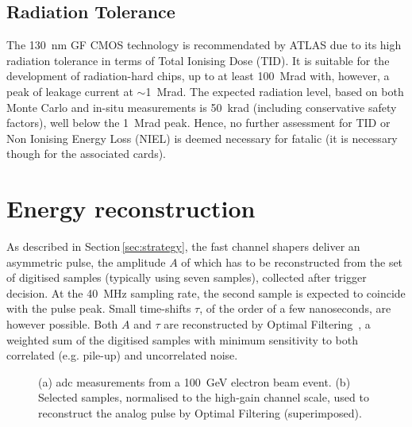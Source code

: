 \subsection{Radiation Tolerance}
\label{subsec:rad}

The \SI{130}{nm} GF CMOS technology is recommendated by ATLAS due to its high radiation tolerance in terms of Total Ionising 
Dose (TID). It is suitable for the development of radiation-hard chips, up to at least \SI{100}{Mrad} with, however, a peak of
leakage current at $\sim$\SI{1}{Mrad}. The expected radiation level, based on both Monte Carlo and in-situ measurements is \SI{50}{krad}
(including conservative safety factors), well below the \SI{1}{Mrad} peak. Hence, no further assessment for TID or Non Ionising 
Energy Loss (NIEL) is deemed necessary for \gls{fatalic} (it is necessary though for the associated cards). 

\clearpage

\section{Energy reconstruction}
\label{sec:EnergyReco}

As described in Section\,\ref{sec:strategy}, the fast channel shapers deliver an asymmetric pulse, the amplitude $A$ 
of which has to be reconstructed from the set of digitised samples (typically using seven samples), collected after
trigger decision. At the \SI{40}{MHz} sampling rate, the second sample is expected to coincide with the pulse peak. 
Small time-shifts $\tau$, of the order of a few nanoseconds, are however possible. Both $A$ and $\tau$ are reconstructed 
by Optimal Filtering~\cite{Fullana:2005dwa}, a weighted sum of the digitised samples with minimum sensitivity to both
correlated (e.g. pile-up) and uncorrelated noise.

\begin{figure}[!tb]
  \centering
  \caption{(a) \gls{adc} measurements from a \SI{100}{GeV} electron beam event. (b) Selected samples, normalised to the high-gain 
  channel scale, used to reconstruct the analog pulse by Optimal Filtering (superimposed).
  \label{fig:pulses}}
\end{figure}

